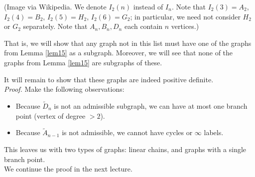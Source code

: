 (Image via Wikipedia. We denote $I_2(n)$ instead of $I_n$. Note that $I_2(3)
= A_2$, $I_2(4) = B_2$, $I_2(5) = H_2$, $I_2(6) = G_2$; in particular, we need
not consider $H_2$ or $G_2$ separately. Note that $A_n, B_n, D_n$ each contain
$n$ vertices.)

That is, we will show that any graph not in this list must have one of the
graphs from Lemma \ref{lem15} as a subgraph.
Moreover, we will see that none of the graphs from Lemma \ref{lem15} are
subgraphs of these.

It will remain to show that these
graphs are indeed positive definite.
\\

{\em Proof.}
Make the following observations:

\begin{itemize}
\item
Because $\widetilde{D}_n$ is not an admissible subgraph, we can have at most
one branch point (vertex of degree $>2$).
\item
Because $\widetilde{A}_{n-1}$ is not admissible, we cannot have cycles or
$\infty$ labels.
\end{itemize}

This leaves us with two types of graphs: linear chains, and graphs with
a single branch point.
\\

We continue the proof in the next lecture.
